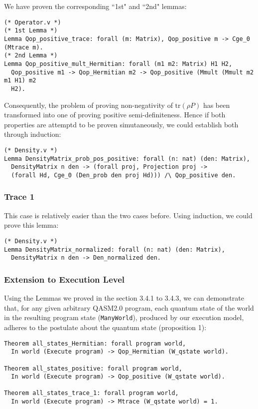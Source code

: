 \documentclass[10pt,a4paper]{article}
\newcommand{\<}{\langle}
\renewcommand{\>}{\rangle}
\newcommand{\tr}[1]{\textrm{tr} \left( #1 \right)}
\begin{document}
We have proven the corresponding ``1st" and ``2nd" lemmas:

\begin{lstlisting}
(* Operator.v *)
(* 1st Lemma *)
Lemma Qop_positive_trace: forall (m: Matrix), Qop_positive m -> Cge_0 (Mtrace m).
(* 2nd Lemma *)
Lemma Qop_positive_mult_Hermitian: forall (m1 m2: Matrix) H1 H2,
  Qop_positive m1 -> Qop_Hermitian m2 -> Qop_positive (Mmult (Mmult m2 m1 H1) m2
  H2).
\end{lstlisting}

Consequently, the problem of proving non-negativity of $\tr{\rho P}$ has been transformed into one of
proving positive semi-definiteness. Hence if both properties are attemptd to be
proven simutaneously, we could establish both through induction:

\begin{lstlisting}
(* Density.v *)
Lemma DensityMatrix_prob_pos_positive: forall (n: nat) (den: Matrix),
  DensityMatrix n den -> (forall proj, Projection proj ->
  (forall Hd, Cge_0 (Den_prob den proj Hd))) /\ Qop_positive den.
\end{lstlisting}


\subsubsection{Trace 1}
This case is relatively easier than the two cases before. Using induction, we
could prove this lemma:

\begin{lstlisting}
(* Density.v *)
Lemma DensityMatrix_normalized: forall (n: nat) (den: Matrix),
  DensityMatrix n den -> Den_normalized den.
\end{lstlisting}


\subsubsection{Extension to Execution Level}

Using the Lemmas we proved in the section 3.4.1 to 3.4.3, we can demonstrate that, for any
given arbitrary QASM2.0 program, each quantum state of the world in the
resulting program state (\texttt{ManyWorld}), produced by our
execution model, adheres to the postulate about the quantum state (proposition
1):

\begin{lstlisting}
Theorem all_states_Hermitian: forall program world,
  In world (Execute program) -> Qop_Hermitian (W_qstate world).

Theorem all_states_positive: forall program world,
  In world (Execute program) -> Qop_positive (W_qstate world).

Theorem all_states_trace_1: forall program world,
  In world (Execute program) -> Mtrace (W_qstate world) = 1.
\end{lstlisting}
\end{document}
